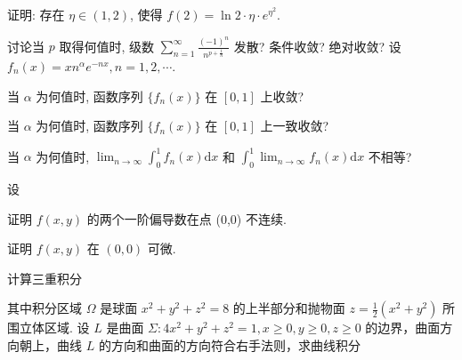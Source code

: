 证明: 存在 $\eta \in (1,2)$, 使得 $f(2) = \ln 2 \cdot \eta \cdot e^{\eta^2}$.\par
\par{}
讨论当 $p$ 取得何值时, 级数 $\sum_{n=1}^{\infty} \frac{(-1)^n}{n^{p+\frac{1}{n}}}$ 发散? 条件收敛? 绝对收敛?
设 $f_n(x) = x n^\alpha e^{-nx}, n = 1,2,\cdots$.\par
当 $\alpha$ 为何值时, 函数序列 $\{f_n(x)\}$ 在 $[0,1]$ 上收敛?\par
当 $\alpha$ 为何值时, 函数序列 $\{f_n(x)\}$ 在 $[0,1]$ 上一致收敛?\par
当 $\alpha$ 为何值时, $\lim_{n\to \infty}\int_0^1 f_n(x)\mathrm{d}x$ 和 $\int_0^1\lim_{n\to \infty}f_n(x)\mathrm{d}x$ 不相等?\par
\par{}
\par{}
设\par
\nopagebreak[4]
证明 $f(x, y)$ 的两个一阶偏导数在点 (0,0) 不连续.\par
证明 $f(x, y)$ 在 $(0,0)$ 可微.\par
\par{}
\par{}
计算三重积分\par
\nopagebreak[4]
\par{}
其中积分区域 $\Omega$ 是球面 $x^{2} + y^{2} + z^{2} = 8$ 的上半部分和抛物面 $z = \frac{1}{2} (x^2 +y^2)$ 所围立体区域.
设 $L$ 是曲面 $\Sigma :4x^{2} + y^{2} + z^{2} = 1,x\geq 0,y\geq 0,z\geq 0$ 的边界，曲面方向朝上，曲线 $L$ 的方向和曲面的方向符合右手法则，求曲线积分\par
\nopagebreak[4]

